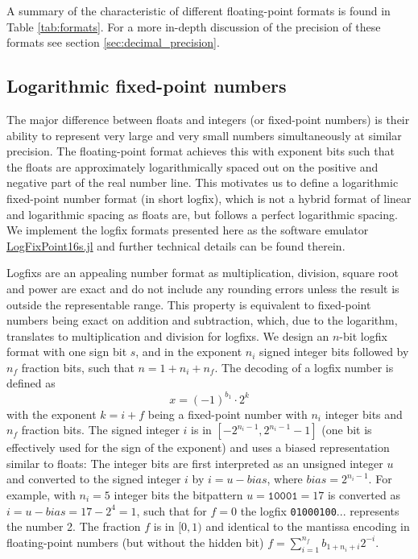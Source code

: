 A summary of the characteristic of different floating-point formats is found in Table \ref{tab:formats}. For a more in-depth discussion of
the precision of these formats see section \ref{sec:decimal_precision}.

\subsection{Logarithmic fixed-point numbers}
\label{sec:logfixs}

The major difference between floats and integers (or fixed-point numbers) is their ability to represent very large and very small
numbers simultaneously at similar precision. The floating-point format achieves this with exponent bits such that the floats are
approximately logarithmically spaced out on the positive and negative part of the real number line. This motivates us to define
a logarithmic fixed-point number format (in short logfix), which is not a hybrid format of linear and logarithmic spacing as floats are, but
follows a perfect logarithmic spacing. We implement the logfix formats presented here as the software emulator 
\href{https://github.com/milankl/LogFixPoint16s.jl}{LogFixPoint16s.jl} and further technical details can be found therein.

Logfixs are an appealing number format as multiplication, division, square root and power are exact and do not include any rounding
errors unless the result is outside the representable range. This property is equivalent to fixed-point numbers being exact
on addition and subtraction, which, due to the logarithm, translates to multiplication and division for logfixs. We design an $n$-bit logfix
format with one sign bit $s$, and in the exponent $n_i$ signed integer bits followed by $n_f$ fraction bits,
such that $n = 1 + n_i + n_f$. The decoding of a logfix number is defined as
\begin{equation}
x = (-1)^{b_1} \cdot 2^k
\label{eq:logfix}
\end{equation}
with the exponent $k = i + f$ being a fixed-point number with $n_i$ integer bits and $n_f$ fraction bits. The signed integer $i$
is in $[-2^{n_i-1},2^{n_i-1}-1]$ (one bit is effectively used for the sign of the exponent) and uses a biased representation similar
to floats: The integer bits are first interpreted as an unsigned integer $u$ and converted to the signed integer $i$ by $i = u - bias$,
where $bias = 2^{n_i-1}$. For example, with $n_i = 5$ integer bits the bitpattern $u = \mathtt{10001} =  17$ is converted as
$i = u - bias = 17-2^4 = 1$, such that for $f=0$ the logfix \texttt{01000100$...$} represents the number 2. The fraction $f$
is in $[0,1)$ and identical to the mantissa encoding in floating-point numbers (but without the hidden bit)
$f = \sum_{i=1}^{n_f} b_{1+n_i+i} 2^{-i}$.

